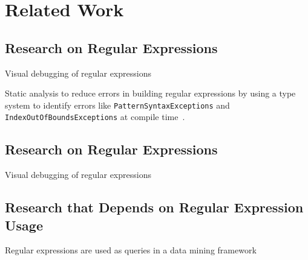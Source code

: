 \section{Related Work}


\subsection{Research on Regular Expressions}
Visual debugging of regular expressions~\cite{Beck:2014:RVD:2591062.2591111}

Static analysis to reduce errors in building regular expressions by using a type system to identify errors like {\tt PatternSyntaxExceptions} and {\tt IndexOutOfBoundsExceptions} at compile time~\cite{Spishak:2012:TSR:2318202.2318207}. 

\subsection{Research on Regular Expressions}
Visual debugging of regular expressions~\cite{Beck:2014:RVD:2591062.2591111}

\subsection{Research that Depends on Regular Expression Usage}
Regular expressions are used as queries in a data mining framework~\cite{Begel:2010:CDE:1806799.1806821}
